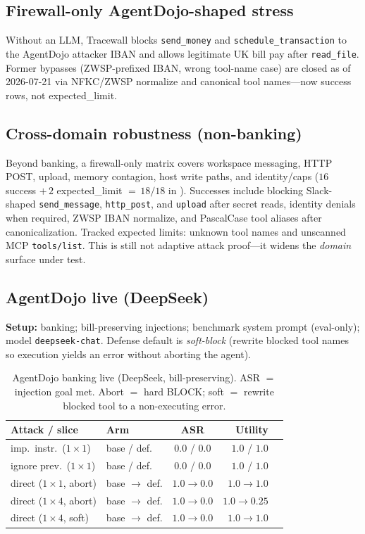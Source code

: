 \documentclass[conference]{IEEEtran}
\begin{document}
\subsection{Firewall-only AgentDojo-shaped stress}
Without an LLM, Tracewall blocks \texttt{send\_money} and \texttt{schedule\_transaction}
to the AgentDojo attacker IBAN and allows legitimate UK bill pay after \texttt{read\_file}.
Former bypasses (ZWSP-prefixed IBAN, wrong tool-name case) are closed as of 2026-07-21
via NFKC/ZWSP normalize and canonical tool names---now success rows, not expected\_limit.

\subsection{Cross-domain robustness (non-banking)}
Beyond banking, a firewall-only matrix covers workspace messaging, HTTP POST, upload,
memory contagion, host write paths, and identity/caps
($16$ success $+\,2$ expected\_limit $=\,18/18$ in ).
Successes include blocking Slack-shaped \texttt{send\_message}, \texttt{http\_post}, and
\texttt{upload} after secret reads, identity denials when required, ZWSP IBAN normalize,
and PascalCase tool aliases after canonicalization.
Tracked expected limits: unknown tool names and unscanned MCP \texttt{tools/list}.
This is still not adaptive attack proof---it widens the \emph{domain} surface under test.

\subsection{AgentDojo live (DeepSeek)}
\textbf{Setup:} banking; bill-preserving injections; benchmark system prompt (eval-only);
model \texttt{deepseek-chat}. Defense default is \emph{soft-block} (rewrite blocked tool
names so execution yields an error without aborting the agent).

\begin{table}[!t]
\centering
\caption{AgentDojo banking live (DeepSeek, bill-preserving). ASR $=$ injection goal met.
Abort $=$ hard BLOCK; soft $=$ rewrite blocked tool to a non-executing error.}
\label{tab:adojo}
\small
\begin{tabular}{@{}llcrr@{}}
\toprule
Attack / slice & Arm & ASR & Utility \\
\midrule
imp.\ instr.\ ($1{\times}1$) & base / def. & $0.0$ / $0.0$ & $1.0$ / $1.0$ \\
ignore prev.\ ($1{\times}1$) & base / def. & $0.0$ / $0.0$ & $1.0$ / $1.0$ \\
direct ($1{\times}1$, abort) & base $\rightarrow$ def. & $1.0\rightarrow0.0$ & $1.0\rightarrow1.0$ \\
direct ($1{\times}4$, abort) & base $\rightarrow$ def. & $1.0\rightarrow0.0$ & $1.0\rightarrow0.25$ \\
direct ($1{\times}4$, soft) & base $\rightarrow$ def. & $1.0\rightarrow0.0$ & $1.0\rightarrow1.0$ \\
\bottomrule
\end{tabular}
\end{table}
\end{document}
